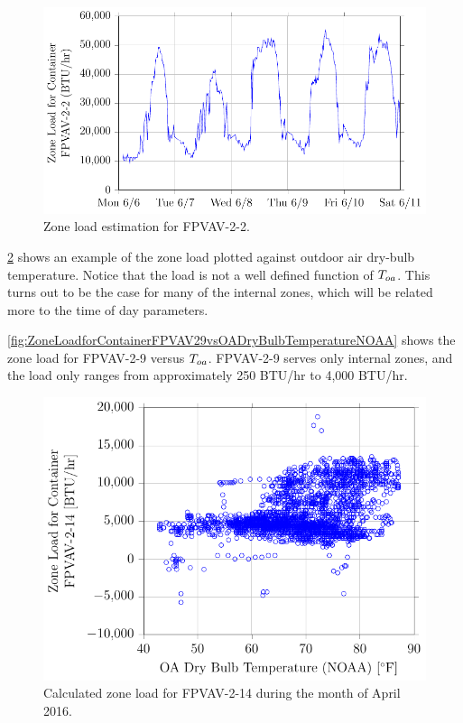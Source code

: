 \begin{figure}
\centering
\includegraphics[]{Plots/2016-06-22-1643-ZoneLoadforContainerFPVAV22-TikzData.pdf}
\caption{Zone load estimation for FPVAV-2-2.}
\label{fig:2016-06-22-1643-ZoneLoadforContainerFPVAV22-TikzData}
\end{figure}



\figref{}
\ref{fig:ZoneLoadforContainerFPVAV214vsOADryBulbTemperatureNOAA} shows
an example of the zone load plotted against outdoor air dry-bulb
temperature. Notice that the load is not a well defined function of
\(T_{oa}\). This turns out to be the case for many of the internal zones,
which will be related more to the time of day parameters. 

\figref{}
\ref{fig:ZoneLoadforContainerFPVAV29vsOADryBulbTemperatureNOAA} shows
the zone load for FPVAV-2-9 versus \(T_{oa}\). FPVAV-2-9 serves only
internal zones, and the load only ranges from approximately 250 BTU/hr
to 4,000 BTU/hr.


\begin{figure}
\centering
\includegraphics[]{Plots/2016-06-22-1704-ZoneLoadforContainerFPVAV214vsOADryBulbTemperatureNOAA.pdf}
\caption{Calculated zone load for FPVAV-2-14 during the month of April 2016.}
\label{fig:ZoneLoadforContainerFPVAV214vsOADryBulbTemperatureNOAA}
\end{figure}


